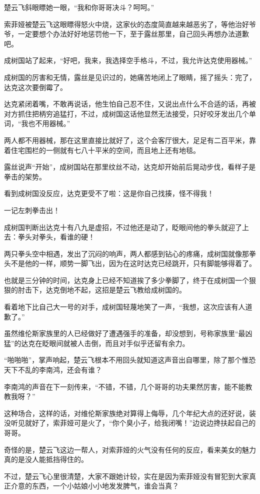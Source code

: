 楚云飞斜眼瞟她一眼，“我和你哥哥决斗？呵呵。”

索菲娅被楚云飞这眼瞟得怒火中烧，这家伙的态度简直越来越恶劣了，等他治好爷爷，一定要想个办法好好地惩罚他一下，至于露丝那里，自己回头再想办法道歉吧。

成树国站了起来，“好吧，我来，我选择空手格斗，不过，我允许达克使用器械。”

成树国的厉害和无情，露丝是见识过的，她痛苦地闭上了眼睛，摇了摇头：完了，达克这次要倒霉了。

达克紧闭着嘴，不敢再说话，他生怕自己忍不住，又说出点什么不合适的话，再被对方抓住把柄穷追猛打，不过，成树国这话他显然无法接受，只好咬牙发出几个单词，“我也不用器械。”

两人都不用器械，那在这里直接比就好了，这个会客厅很大，足足有二百平米，靠着住宅围栏的一侧就有七八十平米的空间，而且地上还有地毯。

露丝说声“开始”，成树国站在那里纹丝不动，达克却开始前后晃动步伐，看样子是拳击的架势。

看到成树国没反应，达克更受不了啦：这是你自己找揍，怪不得我！

一记左刺拳击出！

成树国判断出达克十有八九是虚招，不过他还是动了，眨眼间他的拳头就迎了上去：拳头对拳头，看谁的硬！

两只拳头空中相遇，发出了沉闷的响声，两人都感到钻心的疼痛，成树国就像那拳头不是他的一样，顺势一脚飞出，因为在这时达克已经跳开，只有脚能够得着了。

也就是三分钟的时间，达克身上已经不知道挨了多少拳脚了，终于在成树国一个狠狠的肘击下，达克倒地不起，这招是楚云飞教给成树国的。

看着地下比自己大一号的对手，成树国轻蔑地笑了一声，“我想，这次应该有人道歉了。”

虽然维伦斯家族里的人已经做好了遭遇强手的准备，却没想到，号称家族里“最凶猛”的达克在眨眼间就被人击倒，而且对手似乎还留有余力。

“啪啪啪”，掌声响起，楚云飞根本不用回头就知道这声音出自哪里，除了那个惟恐天下不乱的李南鸿，还会有谁？

李南鸿的声音在下一刻传来，“不错，不错，几个哥哥的功夫果然厉害，能不能教教我呀？”

这种场合，这样的话，对维伦斯家族绝对算得上侮辱，几个年纪大点的还好说，装没听见就好了，索菲娅可是火了，“你个臭小子，给我闭嘴！”边说边搀扶起自己的哥哥。

奇怪的是，楚云飞这边一帮人，对索菲娅的火气没有任何的反应，看来美女的魅力真的是没人能抵挡得住的。

不过，楚云飞心里很清楚，大家不跟她计较，实在是因为索菲娅没有冒犯到大家真正介意的东西，一个小姑娘小小地发发脾气，谁会当真？

